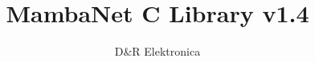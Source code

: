 \documentclass[a4paper]{report}
\begin{document}
\title{MambaNet C Library v1.4}
\author{D\&R Elektronica}
\maketitle

\setcounter{tocdepth}{1}
\tableofcontents
\setcounter{tocdepth}{2}





\end{document}
